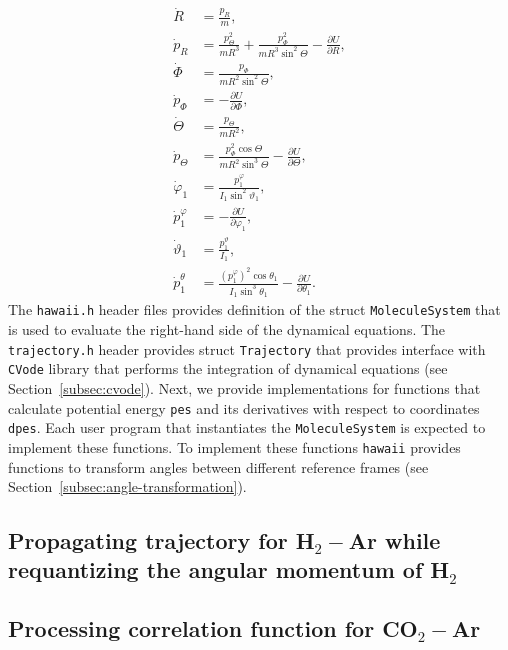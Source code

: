 \documentclass{article}
\newcommand{\lb}{\left(}
\newcommand{\rb}{\right)}
\begin{document}
\begin{align*}
    \dot{R} &= \frac{p_R}{m}, \\
    \dot{p}_R &= \frac{p_\Theta^2}{m R^3} + \frac{p_\Phi^2}{m R^3 \sin^2 \Theta} - \frac{\partial U}{\partial R}, \\
    \dot{\Phi} &= \frac{p_\Phi}{m R^2 \sin^2 \Theta}, \\
    \dot{p}_\Phi &= -\frac{\partial U}{\partial \Phi}, \\
    \dot{\Theta} &= \frac{p_\Theta}{m R^2}, \\
    \dot{p}_\Theta &= \frac{p_\Phi^2 \cos \Theta}{m R^2 \sin^3 \Theta} - \frac{\partial U}{\partial \Theta}, \\
    \dot{\varphi}_1 &= \frac{\displaystyle p_1^{\varphi}}{I_1 \sin^2 \vartheta_1}, \\
    \dot{p}_1^{\varphi} &= -\frac{\partial U}{\partial \varphi_1}, \\
    \dot{\vartheta}_1 &= \frac{p_1^\vartheta}{I_1}, \\ 
    \dot{p}_1^{\theta} &= \frac{\displaystyle \lb p_1^\varphi \rb^2 \cos \theta_1}{I_1 \sin^3 \theta_1} - \frac{\partial U}{\partial \theta_1}.
\end{align*}
%
The \texttt{hawaii.h} header files provides definition of the struct \texttt{MoleculeSystem} that is used to evaluate the right-hand side of the dynamical equations. The \texttt{trajectory.h} header provides struct \texttt{Trajectory} that provides interface with \texttt{CVode} library that performs the integration of dynamical equations (see Section~\ref{subsec:cvode}).
Next, we provide implementations for functions that calculate potential energy \texttt{pes} and its derivatives with respect to coordinates \texttt{dpes}. Each user program that instantiates the \texttt{MoleculeSystem} is expected to implement these functions. To implement these functions \texttt{hawaii} provides functions to transform angles between different reference frames (see Section~\ref{subsec:angle-transformation}).      


\subsection{Propagating trajectory for H$_2-$Ar while requantizing the angular momentum of H$_2$}
\label{subsec:example-req-trajectory}


\subsection{Processing correlation function for CO$_2-$Ar}
\label{subsec:example-processing}
\end{document}
